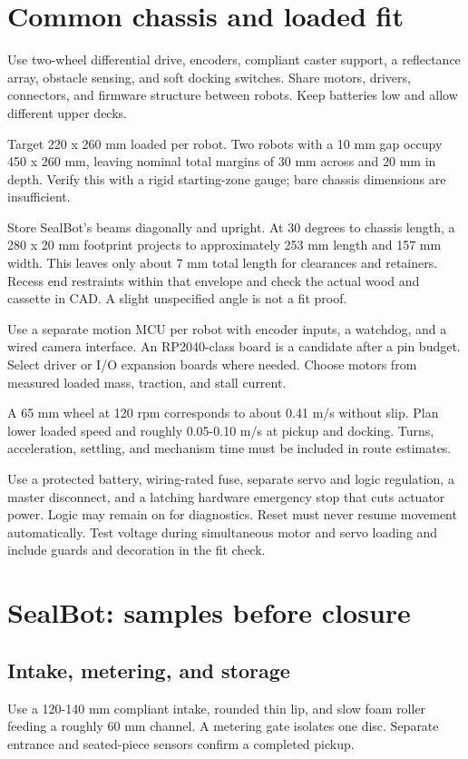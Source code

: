 \documentclass[10pt,a4paper]{article}
\begin{document}
\section{Common chassis and loaded fit}
Use two-wheel differential drive, encoders, compliant caster support, a reflectance array, obstacle sensing, and soft docking switches. Share motors, drivers, connectors, and firmware structure between robots. Keep batteries low and allow different upper decks.

Target 220 x 260 mm loaded per robot. Two robots with a 10 mm gap occupy 450 x 260 mm, leaving nominal total margins of 30 mm across and 20 mm in depth. Verify this with a rigid starting-zone gauge; bare chassis dimensions are insufficient.

Store SealBot's beams diagonally and upright. At 30 degrees to chassis length, a 280 x 20 mm footprint projects to approximately 253 mm length and 157 mm width. This leaves only about 7 mm total length for clearances and retainers. Recess end restraints within that envelope and check the actual wood and cassette in CAD. A slight unspecified angle is not a fit proof.

Use a separate motion MCU per robot with encoder inputs, a watchdog, and a wired camera interface. An RP2040-class board is a candidate after a pin budget. Select driver or I/O expansion boards where needed. Choose motors from measured loaded mass, traction, and stall current.

A 65 mm wheel at 120 rpm corresponds to about 0.41 m/s without slip. Plan lower loaded speed and roughly 0.05-0.10 m/s at pickup and docking. Turns, acceleration, settling, and mechanism time must be included in route estimates.

Use a protected battery, wiring-rated fuse, separate servo and logic regulation, a master disconnect, and a latching hardware emergency stop that cuts actuator power. Logic may remain on for diagnostics. Reset must never resume movement automatically. Test voltage during simultaneous motor and servo loading and include guards and decoration in the fit check.

\section{SealBot: samples before closure}
\subsection{Intake, metering, and storage}
Use a 120-140 mm compliant intake, rounded thin lip, and slow foam roller feeding a roughly 60 mm channel. A metering gate isolates one disc. Separate entrance and seated-piece sensors confirm a completed pickup.
\end{document}
